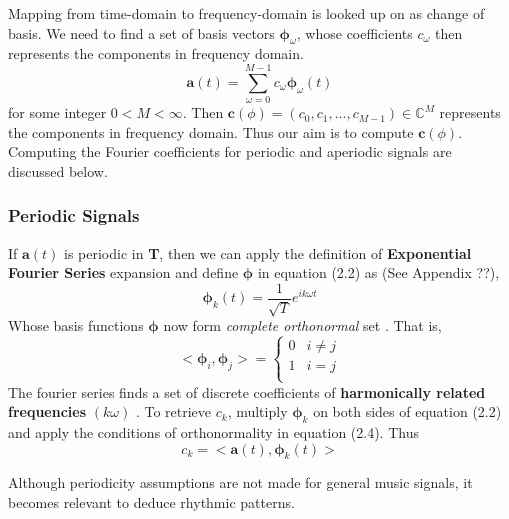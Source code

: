 \noindent Mapping from time-domain to frequency-domain is looked up on as change of basis. We need to find a set of basis vectors $\bm{\phi}_{ \omega }$, whose coefficients $c_{ \omega }$ then represents the components in frequency domain. 
\begin{equation}
\textbf{a}(t) = \displaystyle\sum_{ \omega =0}^{M-1}c_{ \omega }\bm{\phi}_{ \omega }(t) 
\end{equation}
for some integer $0 < M < \infty$. Then $\textbf{c}(\phi) = (c_{0},c_{1}, ...,c_{M-1}) \in \mathbb{C}^M $ represents the components in frequency domain. Thus our aim is to compute $\textbf{c}(\phi)$. Computing the Fourier coefficients for periodic and aperiodic signals are discussed below.

\subsubsection{Periodic Signals}
If $\textbf{a}(t)$ is periodic in \textbf{T}, then we can apply the definition of \textbf{Exponential Fourier Series} expansion and define $\bm{\phi}$ in equation (2.2) as (See Appendix ??),
\begin{equation}
\bm{\phi}_{k}(t) = \frac{1}{\sqrt{T}}e^{ik \omega t}
\end{equation}    
Whose basis functions $\bm{\phi}$ now form \textit{complete orthonormal} set \cite{allen}. That is, 
\begin{equation}
 < \bm{\phi}_{i}, \bm{\phi}_{j} > =
	\begin{cases}
	  0 & i \neq j \\
	  1 &  i = j \\ 
	\end{cases}
\end{equation}
The fourier series finds a set of discrete coefficients of \textbf{harmonically related frequencies} $(k \omega )$ . To retrieve $c_{k}$, multiply $\bm{\phi}_{k}$ on both sides of equation (2.2) and apply the conditions of orthonormality in equation (2.4). Thus
\begin{equation}
c_{k} = <\textbf{a}(t), \bm{\phi}_{k}(t)>
\end{equation}

Although periodicity assumptions are not made for general music signals, it becomes relevant to deduce rhythmic patterns. 


